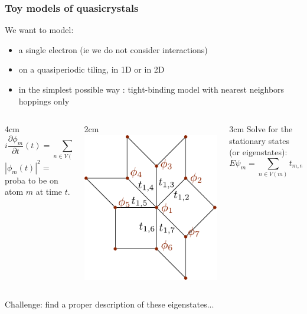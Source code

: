 \documentclass[xcolor=x11names,compress,professionalfonts]{beamer}
\renewcommand{\(}{\begin{columns}}
\renewcommand{\)}{\end{columns}}
\newcommand{\<}[1]{\begin{column}{#1}}
\renewcommand{\>}{\end{column}}
\begin{document}
\begin{frame}
\frametitle{Toy models of quasicrystals}
We want to model:
\begin{itemize}
	\item a single electron (ie we do not consider interactions)
	\item on a quasiperiodic tiling, in 1D or in 2D
	\item in the simplest possible way : tight-binding model with nearest neighbors hoppings only
\end{itemize}

\begin{columns}
\<{4cm}
\[
	i \frac{\partial \phi_m}{\partial t}(t) = \sum_{n \in V(m)} t_{m,n} \phi_n(t)
\]
$|\phi_m(t)|^2= $ proba to be on atom $m$ at time $t$.
\>

\<{2cm}
\includegraphics[scale=0.34]{img/ham_example.pdf}
\>

\<{3cm}
Solve for the stationary states (or eigenstates):
\[
	E \psi_m = \sum_{n \in V(m)} t_{m,n} \psi_n
\]
\>
\end{columns}

Challenge: find a proper description of these eigenstates... 
\end{frame}
\end{document}
